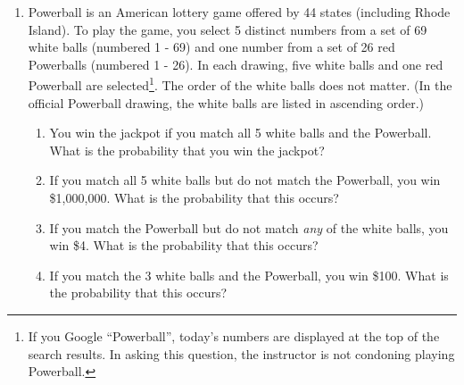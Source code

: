 \documentclass[12pt]{article}
\begin{document}
\begin{enumerate}
\item Powerball is an American lottery game offered by 44 states (including Rhode Island). To play the game, you select 5 distinct numbers from a set of 69 white balls (numbered 1 - 69) and one number from a set of 26 red Powerballs (numbered 1 - 26). In each drawing, five white balls and one red Powerball are selected\footnote{If you Google ``Powerball'', today's numbers are displayed at the top of the search results. In asking this question, the instructor is not condoning playing Powerball. }. The order of the white balls does not matter. (In the official Powerball drawing, the white balls are listed in ascending order.) 
\begin{enumerate}
\item You win the jackpot if you match all 5 white balls and the Powerball. What is the probability that you win the jackpot?
\item If you match all 5 white balls but do not match the Powerball, you win \$1,000,000. What is the probability that this occurs?
\item If you match the Powerball but do not match \emph{any} of the white balls, you win \$4. What is the probability that this occurs?
\item If you match the 3 white balls and the Powerball, you win \$100. What is the probability that this occurs?
\end{enumerate}

\end{enumerate}
\end{document}
